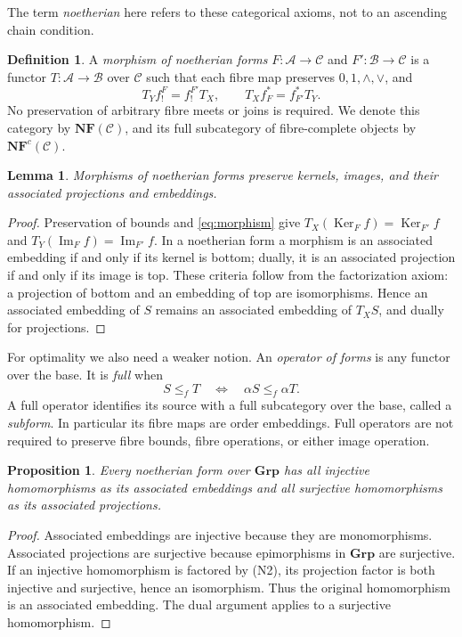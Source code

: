 \documentclass[12pt,a4paper]{amsart}
\newtheorem{proposition}[theorem]{Proposition}
\newtheorem{lemma}[theorem]{Lemma}
\theoremstyle{definition}
\newtheorem{definition}[theorem]{Definition}
\newcommand{\Grp}{\mathbf{Grp}}
\newcommand{\im}{\operatorname{Im}}
\newcommand{\Ker}{\operatorname{Ker}}
\newcommand{\NF}{\mathbf{NF}}
\newcommand{\C}{\mathcal C}
\newcommand{\A}{\mathcal A}
\newcommand{\B}{\mathcal B}
\begin{document}
The term \emph{noetherian} here refers to these categorical axioms, not to an ascending chain condition.

\begin{definition}\label{def:nfmorphism}
A \emph{morphism of noetherian forms} $F:\A\to\C$ and $F':\B\to\C$ is a functor $T:\A\to\B$ over $\C$ such that each fibre map preserves $0,1,\wedge,\vee$, and
\begin{equation}\label{eq:morphism}
 T_Y f_!^F=f_!^{F'}T_X,\qquad
 T_X f_F^*=f_{F'}^*T_Y.
\end{equation}
No preservation of arbitrary fibre meets or joins is required. We denote this category by $\NF(\C)$, and its full subcategory of fibre-complete objects by $\NF^c(\C)$.
\end{definition}

\begin{lemma}\label{lem:preserve}
Morphisms of noetherian forms preserve kernels, images, and their associated projections and embeddings.
\end{lemma}
\begin{proof}
Preservation of bounds and \eqref{eq:morphism} give
$T_X(\Ker_F f)=\Ker_{F'}f$ and $T_Y(\im_F f)=\im_{F'}f$.
In a noetherian form a morphism is an associated embedding if and only if its kernel is bottom; dually, it is an associated projection if and only if its image is top. These criteria follow from the factorization axiom: a projection of bottom and an embedding of top are isomorphisms. Hence an associated embedding of $S$ remains an associated embedding of $T_XS$, and dually for projections.
\end{proof}

For optimality we also need a weaker notion. An \emph{operator of forms} is any functor over the base. It is \emph{full} when
\[
 S\leq_f T\quad\Longleftrightarrow\quad
 \alpha S\leq_f\alpha T.
\]
A full operator identifies its source with a full subcategory over the base, called a \emph{subform}. In particular its fibre maps are order embeddings. Full operators are not required to preserve fibre bounds, fibre operations, or either image operation.

\begin{proposition}\label{prop:grpclasses}
Every noetherian form over $\Grp$ has all injective homomorphisms as its associated embeddings and all surjective homomorphisms as its associated projections.
\end{proposition}
\begin{proof}
Associated embeddings are injective because they are monomorphisms. Associated projections are surjective because epimorphisms in $\Grp$ are surjective. If an injective homomorphism is factored by \textup{(N2)}, its projection factor is both injective and surjective, hence an isomorphism. Thus the original homomorphism is an associated embedding. The dual argument applies to a surjective homomorphism.
\end{proof}
\end{document}
